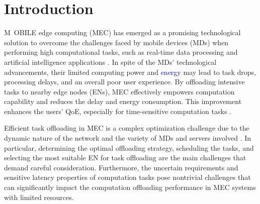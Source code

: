 \documentclass[10pt, journal,letterpaper]{IEEEtran}
\begin{document}

\section{Introduction} 

\lettrine{M}{ \,OBILE} edge computing (MEC) \cite{mao2017survey} has emerged as a promising technological solution to overcome the challenges faced by mobile devices (MDs) when performing high computational tasks, such as real-time data processing and artificial intelligence applications \cite{zhou2019edge} \cite{yousefpour2019all}. In spite of the MDs' technological advancements, their limited computing power and \textcolor{blue}{energy} may lead to task drops, processing delays, and an overall poor user experience. By offloading intensive tasks to nearby edge nodes (ENs), MEC effectively empowers computation capability and reduces the delay and energy consumption. This improvement enhances the users' QoE, especially for time-sensitive computation tasks \cite{TNSE-QOE-24} \cite{ shah2018hierarchical}. 

Efficient task offloading in MEC is a complex optimization challenge due to the dynamic nature of the network and the variety of MDs and servers involved \cite{jiang2019toward} \cite{TNSE-WU-24}. In particular, determining the optimal offloading strategy, scheduling the tasks, and selecting the most suitable EN for task offloading are the main challenges that demand careful consideration. Furthermore, the uncertain requirements and sensitive latency properties of computation tasks pose nontrivial challenges that can significantly impact the computation offloading performance in MEC systems with limited resources. 




	
	
	
\end{document}
